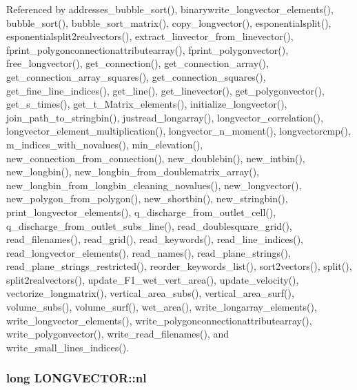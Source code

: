 Referenced by addresses\-\_\-bubble\-\_\-sort(), binarywrite\-\_\-longvector\-\_\-elements(), bubble\-\_\-sort(), bubble\-\_\-sort\-\_\-matrix(), copy\-\_\-longvector(), esponentialsplit(), esponentialsplit2realvectors(), extract\-\_\-linvector\-\_\-from\-\_\-linevector(), fprint\-\_\-polygonconnectionattributearray(), fprint\-\_\-polygonvector(), free\-\_\-longvector(), get\-\_\-connection(), get\-\_\-connection\-\_\-array(), get\-\_\-connection\-\_\-array\-\_\-squares(), get\-\_\-connection\-\_\-squares(), get\-\_\-fine\-\_\-line\-\_\-indices(), get\-\_\-line(), get\-\_\-linevector(), get\-\_\-polygonvector(), get\-\_\-s\-\_\-times(), get\-\_\-t\-\_\-\-Matrix\-\_\-elements(), initialize\-\_\-longvector(), join\-\_\-path\-\_\-to\-\_\-stringbin(), justread\-\_\-longarray(), longvector\-\_\-correlation(), longvector\-\_\-element\-\_\-multiplication(), longvector\-\_\-n\-\_\-moment(), longvectorcmp(), m\-\_\-indices\-\_\-with\-\_\-novalues(), min\-\_\-elevation(), new\-\_\-connection\-\_\-from\-\_\-connection(), new\-\_\-doublebin(), new\-\_\-intbin(), new\-\_\-longbin(), new\-\_\-longbin\-\_\-from\-\_\-doublematrix\-\_\-array(), new\-\_\-longbin\-\_\-from\-\_\-longbin\-\_\-cleaning\-\_\-novalues(), new\-\_\-longvector(), new\-\_\-polygon\-\_\-from\-\_\-polygon(), new\-\_\-shortbin(), new\-\_\-stringbin(), print\-\_\-longvector\-\_\-elements(), q\-\_\-discharge\-\_\-from\-\_\-outlet\-\_\-cell(), q\-\_\-discharge\-\_\-from\-\_\-outlet\-\_\-subs\-\_\-line(), read\-\_\-doublesquare\-\_\-grid(), read\-\_\-filenames(), read\-\_\-grid(), read\-\_\-keywords(), read\-\_\-line\-\_\-indices(), read\-\_\-longvector\-\_\-elements(), read\-\_\-names(), read\-\_\-plane\-\_\-strings(), read\-\_\-plane\-\_\-strings\-\_\-restricted(), reorder\-\_\-keywords\-\_\-list(), sort2vectors(), split(), split2realvectors(), update\-\_\-\-F1\-\_\-wet\-\_\-vert\-\_\-area(), update\-\_\-velocity(), vectorize\-\_\-longmatrix(), vertical\-\_\-area\-\_\-subs(), vertical\-\_\-area\-\_\-surf(), volume\-\_\-subs(), volume\-\_\-surf(), wet\-\_\-area(), write\-\_\-longarray\-\_\-elements(), write\-\_\-longvector\-\_\-elements(), write\-\_\-polygonconnectionattributearray(), write\-\_\-polygonvector(), write\-\_\-read\-\_\-filenames(), and write\-\_\-small\-\_\-lines\-\_\-indices().

\hypertarget{struct_l_o_n_g_v_e_c_t_o_r_ae4781cf6040d079de5f054f77eb33a17}{
\subsubsection[{nl}]{\setlength{\rightskip}{0pt plus 5cm}long L\-O\-N\-G\-V\-E\-C\-T\-O\-R\-::nl}}\label{struct_l_o_n_g_v_e_c_t_o_r_ae4781cf6040d079de5f054f77eb33a17}


